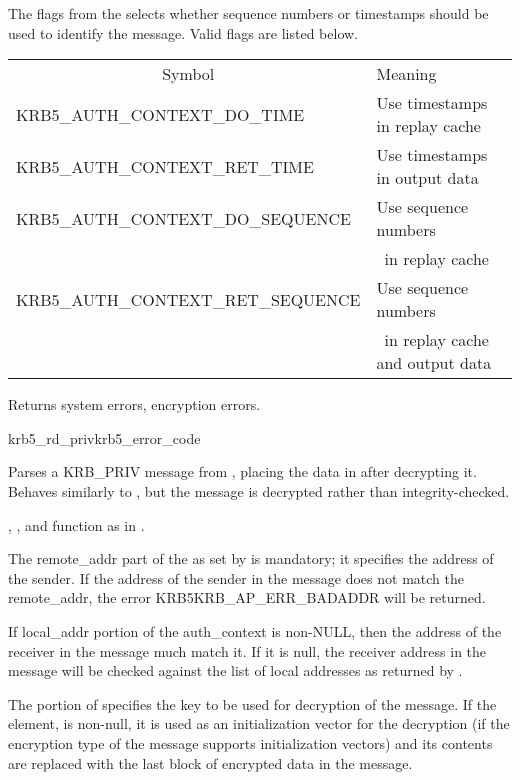 The flags from the  selects whether sequence numbers or timestamps
should be used to identify the message.  Valid flags are listed below.

\begin{tabular}{ll}
\multicolumn{1}{c}{Symbol} & Meaning \\
KRB5_AUTH_CONTEXT_DO_TIME& Use timestamps in replay cache\\
KRB5_AUTH_CONTEXT_RET_TIME& Use timestamps in output data\\
KRB5_AUTH_CONTEXT_DO_SEQUENCE& Use sequence numbers\\
	&\ in replay cache\\
KRB5_AUTH_CONTEXT_RET_SEQUENCE& Use sequence numbers\\
	&\ in replay cache and output data \\
\end{tabular}

Returns system errors, encryption errors.

\begin{funcdecl}{krb5_rd_priv}{krb5_error_code}{\funcinout}
\funcin
{}
\funcout
{}
\end{funcdecl}

Parses a KRB_PRIV message from , placing the data in
 after decrypting it.  Behaves similarly to
, but the message is decrypted rather than
integrity-checked.

, , 
 and 
function as in .


The remote_addr part of the  as set by
 is mandatory;  it
specifies the address of the sender.  If the address of the sender in
the message does not match the remote_addr, the error
KRB5KRB_AP_ERR_BADADDR will be returned.

If local_addr portion of the auth_context is non-NULL, then the address
of the receiver in the message much match it.  If it is null, the
receiver address in the message will be checked against the list of
local addresses as returned by .

The  portion of  specifies
the key to be used for decryption of the message.  If the
 element, is non-null, it is used as an
initialization vector for the decryption (if the encryption type of the
message supports initialization vectors) and its contents are replaced
with the last block of encrypted data in the message.

